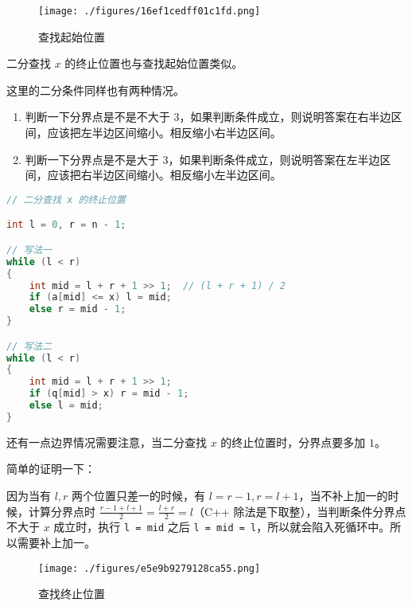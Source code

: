 \begin{figure}[ht]
\centering
\texttt{[image: ./figures/16ef1cedff01c1fd.png]}
\caption{查找起始位置} \label{fig_BS_1}
\end{figure}


二分查找 $x$ 的终止位置也与查找起始位置类似。

这里的二分条件同样也有两种情况。

\begin{enumerate}
\item 判断一下分界点是不是不大于 $3$，如果判断条件成立，则说明答案在右半边区间，应该把左半边区间缩小。相反缩小右半边区间。
\item 判断一下分界点是不是大于 $3$，如果判断条件成立，则说明答案在左半边区间，应该把右半边区间缩小。相反缩小左半边区间。
\end{enumerate}
\begin{lstlisting}[language=cpp]
// 二分查找 x 的终止位置

int l = 0, r = n - 1;

// 写法一
while (l < r)
{
	int mid = l + r + 1 >> 1;  // (l + r + 1) / 2
    if (a[mid] <= x) l = mid;
    else r = mid - 1;
}

// 写法二
while (l < r)
{
    int mid = l + r + 1 >> 1;
    if (q[mid] > x) r = mid - 1;
    else l = mid;
}
\end{lstlisting}



还有一点边界情况需要注意，当二分查找 $x$ 的终止位置时，分界点要多加 $1$。

简单的证明一下：

因为当有 $l, r$ 两个位置只差一的时候，有 $l = r - 1, r = l + 1$，当不补上加一的时候，计算分界点时 $\frac{r - 1 + l + 1}{2} = \frac{l+r}{2}=l$（C++ 除法是下取整），当判断条件分界点不大于 $x$ 成立时，执行 \verb|l = mid| 之后 \verb|l = mid = l|，所以就会陷入死循环中。所以需要补上加一。

\begin{figure}[ht]
\centering
\texttt{[image: ./figures/e5e9b9279128ca55.png]}
\caption{查找终止位置} \label{fig_BS_2}
\end{figure}
